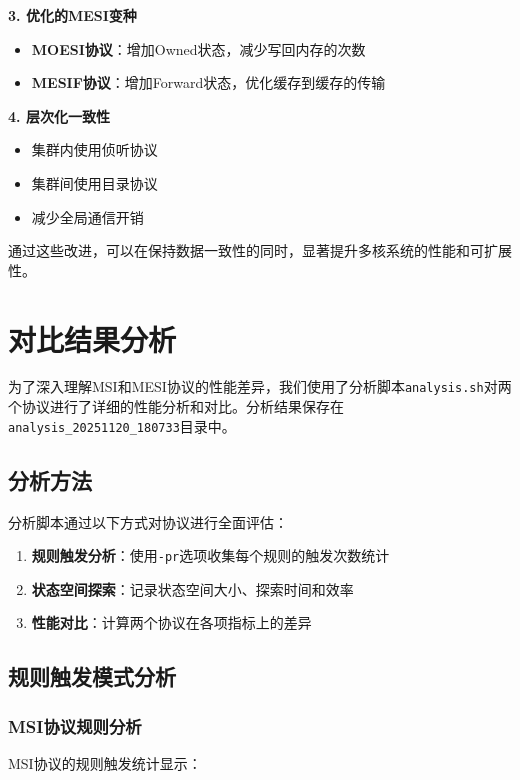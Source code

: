 \documentclass[a4paper]{article}
\begin{document}
\textbf{3. 优化的MESI变种}
\begin{itemize}
    \item \textbf{MOESI协议}：增加Owned状态，减少写回内存的次数
    \item \textbf{MESIF协议}：增加Forward状态，优化缓存到缓存的传输
\end{itemize}

\textbf{4. 层次化一致性}
\begin{itemize}
    \item 集群内使用侦听协议
    \item 集群间使用目录协议
    \item 减少全局通信开销
\end{itemize}

通过这些改进，可以在保持数据一致性的同时，显著提升多核系统的性能和可扩展性。

\section{对比结果分析}

为了深入理解MSI和MESI协议的性能差异，我们使用了分析脚本\texttt{analysis.sh}对两个协议进行了详细的性能分析和对比。分析结果保存在\texttt{analysis\_20251120\_180733}目录中。

\subsection{分析方法}

分析脚本通过以下方式对协议进行全面评估：

\begin{enumerate}
    \item \textbf{规则触发分析}：使用\texttt{-pr}选项收集每个规则的触发次数统计
    \item \textbf{状态空间探索}：记录状态空间大小、探索时间和效率
    \item \textbf{性能对比}：计算两个协议在各项指标上的差异
\end{enumerate}

\subsection{规则触发模式分析}

\subsubsection{MSI协议规则分析}

MSI协议的规则触发统计显示：
\end{document}
